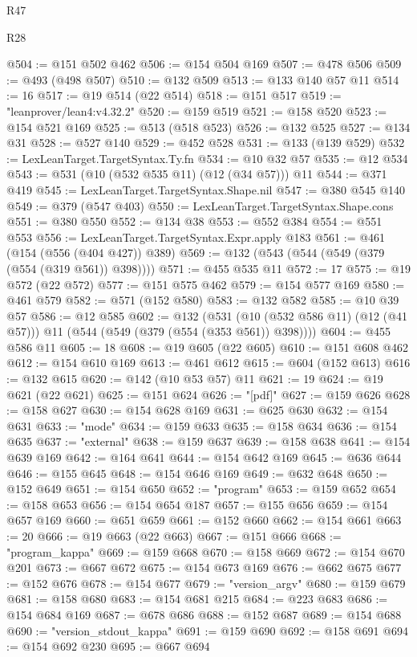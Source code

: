\begin{lexlean}{R47}
\begin{lexlean}{R28}
\begin{coremodule}
{{{{{{{{{{{{{{{{{{{{{{{{{{{{{{{{{{{{{{{{{{{{{{{{{{{{{{{{{{{{{{{{{{{{{{{{{{{{{{{{{{{{{{{{{{{{{{{{{{{{{{{{{{{{{{{{{{{{{{{{{{{{{{{{{{{{{@504 := @151 @502 @462
@506 := @154 @504 @169
@507 := @478 @506
@509 := @493 (@498 @507)
@510 := @132 @509
@513 := @133 @140 @57 @11
@514 := 16
@517 := @19 @514 (@22 @514)
@518 := @151 @517
@519 := "leanprover/lean4:v4.32.2"
@520 := @159 @519
@521 := @158 @520
@523 := @154 @521 @169
@525 := @513 (@518 @523)
@526 := @132 @525
@527 := @134 @31
@528 := @527 @140
@529 := @452 @528
@531 := @133 (@139 @529)
@532 := LexLeanTarget.TargetSyntax.Ty.fn
@534 := @10 @32 @57
@535 := @12 @534
@543 := @531 (@10 (@532 @535 @11) (@12 (@34 @57))) @11
@544 := @371 @419
@545 := LexLeanTarget.TargetSyntax.Shape.nil
@547 := @380 @545 @140
@549 := @379 (@547 @403)
@550 := LexLeanTarget.TargetSyntax.Shape.cons
@551 := @380 @550
@552 := @134 @38
@553 := @552 @384
@554 := @551 @553
@556 := LexLeanTarget.TargetSyntax.Expr.apply @183
@561 := @461 (@154 (@556 (@404 @427)) @389)
@569 := @132 (@543 (@544 (@549 (@379 (@554 (@319 @561)) @398))))
@571 := @455 @535 @11
@572 := 17
@575 := @19 @572 (@22 @572)
@577 := @151 @575 @462
@579 := @154 @577 @169
@580 := @461 @579
@582 := @571 (@152 @580)
@583 := @132 @582
@585 := @10 @39 @57
@586 := @12 @585
@602 := @132
    (@531 (@10 (@532 @586 @11) (@12 (@41 @57))) @11 (@544 (@549 (@379 (@554 (@353 @561)) @398))))
@604 := @455 @586 @11
@605 := 18
@608 := @19 @605 (@22 @605)
@610 := @151 @608 @462
@612 := @154 @610 @169
@613 := @461 @612
@615 := @604 (@152 @613)
@616 := @132 @615
@620 := @142 (@10 @53 @57) @11
@621 := 19
@624 := @19 @621 (@22 @621)
@625 := @151 @624
@626 := "[pdf]"
@627 := @159 @626
@628 := @158 @627
@630 := @154 @628 @169
@631 := @625 @630
@632 := @154 @631
@633 := "mode"
@634 := @159 @633
@635 := @158 @634
@636 := @154 @635
@637 := "external"
@638 := @159 @637
@639 := @158 @638
@641 := @154 @639 @169
@642 := @164 @641
@644 := @154 @642 @169
@645 := @636 @644
@646 := @155 @645
@648 := @154 @646 @169
@649 := @632 @648
@650 := @152 @649
@651 := @154 @650
@652 := "program"
@653 := @159 @652
@654 := @158 @653
@656 := @154 @654 @187
@657 := @155 @656
@659 := @154 @657 @169
@660 := @651 @659
@661 := @152 @660
@662 := @154 @661
@663 := 20
@666 := @19 @663 (@22 @663)
@667 := @151 @666
@668 := "program_kappa"
@669 := @159 @668
@670 := @158 @669
@672 := @154 @670 @201
@673 := @667 @672
@675 := @154 @673 @169
@676 := @662 @675
@677 := @152 @676
@678 := @154 @677
@679 := "version_argv"
@680 := @159 @679
@681 := @158 @680
@683 := @154 @681 @215
@684 := @223 @683
@686 := @154 @684 @169
@687 := @678 @686
@688 := @152 @687
@689 := @154 @688
@690 := "version_stdout_kappa"
@691 := @159 @690
@692 := @158 @691
@694 := @154 @692 @230
@695 := @667 @694
}}}}}}}}}}}}}}}}}}}}}}}}}}}}}}}}}}}}}}}}}}}}}}}}}}}}}}}}}}}}}}}}}}}}}}}}}}}}}}}}}}}}}}}}}}}}}}}}}}}}}}}}}}}}}}}}}}}}}}}}}}}}}}}}}}}}}
\end{coremodule}
\end{lexlean}
\end{lexlean}
